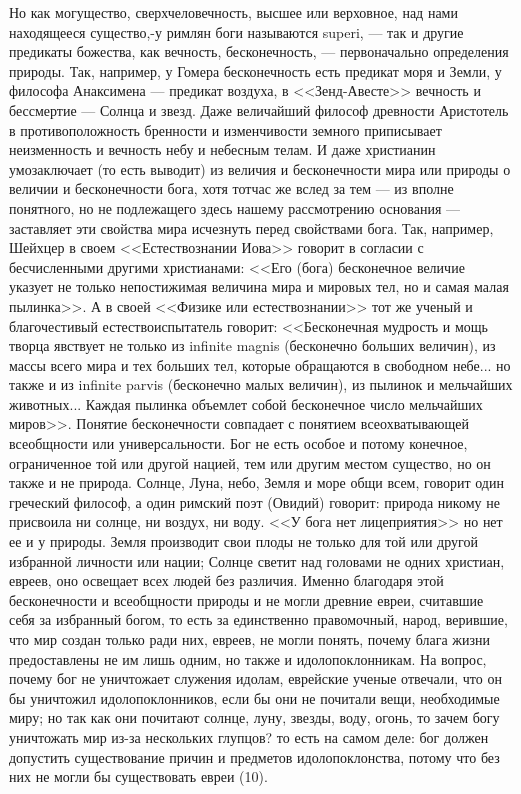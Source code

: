 \documentclass[12pt]{article}
\begin{document}
Но как могущество, сверхчеловечность, высшее или верховное, над нами находящееся существо,-у римлян боги называются superi, --- так и другие предикаты божества, как вечность, бесконечность, --- первоначально определения природы. Так, например, у Гомера бесконечность есть предикат моря и Земли, у философа Анаксимена --- предикат воздуха, в <<Зенд-Авесте>> вечность и бессмертие --- Солнца и звезд. Даже величайший философ древности Аристотель в противоположность бренности и изменчивости земного приписывает неизменность и вечность небу и небесным телам. И даже христианин умозаключает (то есть выводит) из величия и бесконечности мира или природы о величии и бесконечности бога, хотя тотчас же вслед за тем --- из вполне понятного, но не подлежащего здесь нашему рассмотрению основания --- заставляет эти свойства мира исчезнуть перед свойствами бога. Так, например, Шейхцер в своем <<Естествознании Иова>> говорит в согласии с бесчисленными другими христианами: <<Его (бога) бесконечное величие указует не только непостижимая величина мира и мировых тел, но и самая малая пылинка>>. А в своей <<Физике или естествознании>> тот же ученый и благочестивый естествоиспытатель говорит: <<Бесконечная мудрость и мощь творца явствует не только из infinite magnis (бесконечно больших величин), из массы всего мира и тех больших тел, которые обращаются в свободном небе... но также и из infinite parvis (бесконечно малых величин), из пылинок и мельчайших животных... Каждая пылинка объемлет собой бесконечное число мельчайших миров>>. Понятие бесконечности совпадает с понятием всеохватывающей всеобщности или универсальности. Бог не есть особое и потому конечное, ограниченное той или другой нацией, тем или другим местом существо, но он также и не природа. Солнце, Луна, небо, Земля и море общи всем, говорит один греческий философ, а один римский поэт (Овидий) говорит: природа никому не присвоила ни солнце, ни воздух, ни воду. <<У бога нет лицеприятия>>  но нет ее и у природы. Земля производит свои плоды не только для той или другой избранной личности или нации; Солнце светит над головами не одних христиан, евреев, оно освещает всех людей без различия. Именно благодаря этой бесконечности и всеобщности природы и не могли древние евреи, считавшие себя за избранный богом, то есть за единственно правомочный, народ, верившие, что мир создан только ради них, евреев, не могли понять, почему блага жизни предоставлены не им лишь одним, но также и идолопоклонникам. На вопрос, почему бог не уничтожает служения идолам, еврейские ученые отвечали, что он бы уничтожил идолопоклонников, если бы они не почитали вещи, необходимые миру; но так как они почитают солнце, луну, звезды, воду, огонь, то зачем богу уничтожать мир из-за нескольких глупцов? то есть на самом деле: бог должен допустить существование причин и предметов идолопоклонства, потому что без них не могли бы существовать евреи (10). 
\end{document}
